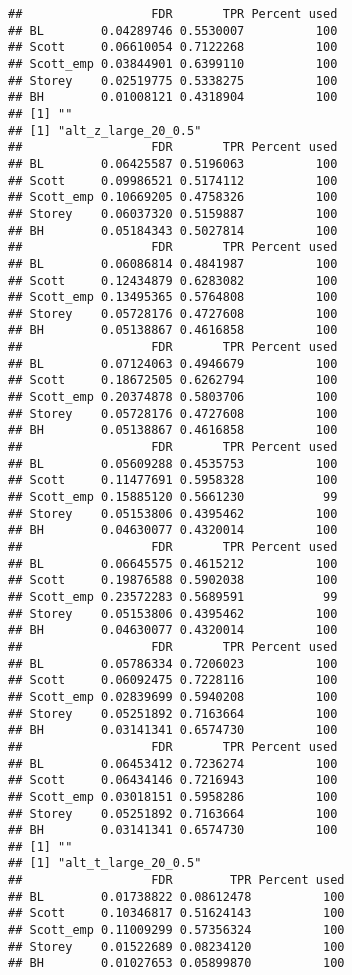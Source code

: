 \documentclass{article}\usepackage[]{graphicx}\usepackage[]{color}
\makeatletter
\newenvironment{kframe}{%
 \def\at@end@of@kframe{}%
 \ifinner\ifhmode%
  \def\at@end@of@kframe{\end{minipage}}%
  \begin{minipage}{\columnwidth}%
 \fi\fi%
 \def\FrameCommand##1{\hskip\@totalleftmargin \hskip-\fboxsep
 \colorbox{shadecolor}{##1}\hskip-\fboxsep
     \hskip-\linewidth \hskip-\@totalleftmargin \hskip\columnwidth}%
 \MakeFramed {\advance\hsize-\width
   \@totalleftmargin\z@ \linewidth\hsize
   \@setminipage}}%
 {\par\unskip\endMakeFramed%
 \at@end@of@kframe}
\newenvironment{knitrout}{}{} %
\makeatother
\begin{document}
\begin{knitrout}
\begin{kframe}
\begin{verbatim}
##                  FDR       TPR Percent used
## BL        0.04289746 0.5530007          100
## Scott     0.06610054 0.7122268          100
## Scott_emp 0.03844901 0.6399110          100
## Storey    0.02519775 0.5338275          100
## BH        0.01008121 0.4318904          100
## [1] ""
## [1] "alt_z_large_20_0.5"
##                  FDR       TPR Percent used
## BL        0.06425587 0.5196063          100
## Scott     0.09986521 0.5174112          100
## Scott_emp 0.10669205 0.4758326          100
## Storey    0.06037320 0.5159887          100
## BH        0.05184343 0.5027814          100
##                  FDR       TPR Percent used
## BL        0.06086814 0.4841987          100
## Scott     0.12434879 0.6283082          100
## Scott_emp 0.13495365 0.5764808          100
## Storey    0.05728176 0.4727608          100
## BH        0.05138867 0.4616858          100
##                  FDR       TPR Percent used
## BL        0.07124063 0.4946679          100
## Scott     0.18672505 0.6262794          100
## Scott_emp 0.20374878 0.5803706          100
## Storey    0.05728176 0.4727608          100
## BH        0.05138867 0.4616858          100
##                  FDR       TPR Percent used
## BL        0.05609288 0.4535753          100
## Scott     0.11477691 0.5958328          100
## Scott_emp 0.15885120 0.5661230           99
## Storey    0.05153806 0.4395462          100
## BH        0.04630077 0.4320014          100
##                  FDR       TPR Percent used
## BL        0.06645575 0.4615212          100
## Scott     0.19876588 0.5902038          100
## Scott_emp 0.23572283 0.5689591           99
## Storey    0.05153806 0.4395462          100
## BH        0.04630077 0.4320014          100
##                  FDR       TPR Percent used
## BL        0.05786334 0.7206023          100
## Scott     0.06092475 0.7228116          100
## Scott_emp 0.02839699 0.5940208          100
## Storey    0.05251892 0.7163664          100
## BH        0.03141341 0.6574730          100
##                  FDR       TPR Percent used
## BL        0.06453412 0.7236274          100
## Scott     0.06434146 0.7216943          100
## Scott_emp 0.03018151 0.5958286          100
## Storey    0.05251892 0.7163664          100
## BH        0.03141341 0.6574730          100
## [1] ""
## [1] "alt_t_large_20_0.5"
##                  FDR        TPR Percent used
## BL        0.01738822 0.08612478          100
## Scott     0.10346817 0.51624143          100
## Scott_emp 0.11009299 0.57356324          100
## Storey    0.01522689 0.08234120          100
## BH        0.01027653 0.05899870          100

\end{verbatim}
\end{kframe}
\end{knitrout}
\end{document}
